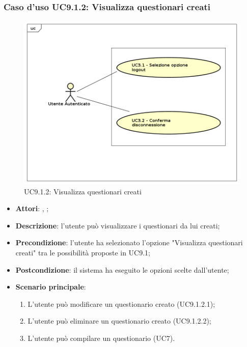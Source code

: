 		\subsubsection{Caso d'uso UC9.1.2: Visualizza questionari creati}
		\label{UC9.1.2}
		\begin{figure}[h]
			\centering
		\includegraphics[scale=0.5,keepaspectratio]{UML/UC9.png}
			\caption{UC9.1.2: Visualizza questionari creati}
		\end{figure}
		\FloatBarrier
		\begin{itemize}
			\item \textbf{Attori}: \uau, \uaupro;
			\item \textbf{Descrizione}: l'utente può visualizzare i questionari da lui creati;
			\item \textbf{Precondizione}: l'utente ha selezionato l'opzione "Visualizza questionari creati" tra le possibilità proposte in UC9.1;
			\item \textbf{Postcondizione}: il sistema ha eseguito le opzioni scelte dall'utente;
			\item \textbf{Scenario principale}: 
				\begin{enumerate}
					\item L'utente può modificare un questionario creato (UC9.1.2.1);
					\item L'utente può eliminare un questionario creato (UC9.1.2.2);
					\item L'utente può compilare un questionario (UC7).
				\end{enumerate}
		\end{itemize}
		
